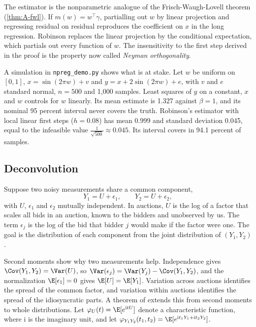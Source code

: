 The estimator is the nonparametric analogue of the Frisch-Waugh-Lovell theorem (\cref{thm:A-fwl}). If
$m(w)=w^\top\gamma$, partialling out $w$ by linear projection and regressing residual on residual
reproduces the coefficient on $x$ in the long regression. Robinson replaces the linear projection by
the conditional expectation, which partials out every function of $w$. The insensitivity to the first
step derived in the proof is the property now called \emph{Neyman orthogonality}.

A simulation in \texttt{npreg\_demo.py} shows what is at stake. Let $w$ be uniform on $[0,1]$,
$x=\sin(2\pi w)+v$ and $y=x+2\sin(2\pi w)+e$, with $v$ and $e$ standard normal, $n=500$ and 1,000 samples.
Least squares of $y$ on a constant, $x$ and $w$ controls for $w$ linearly. Its mean estimate is 1.327
against $\beta=1$, and its nominal 95 percent interval never covers the truth. Robinson's estimator with
local linear first steps ($h=0.08$) has mean 0.999 and standard deviation 0.045, equal to the infeasible
value $\frac{1}{\sqrt{500}}\approx0.045$. Its interval covers in 94.1 percent of samples.

\subsection{Deconvolution}\label{sec:A-deconv}

Suppose two noisy measurements share a common component,
\begin{equation}\label{eq:A-meas}
Y_1=U+\epsilon_1,\qquad Y_2=U+\epsilon_2,
\end{equation}
with $U$, $\epsilon_1$ and $\epsilon_2$ mutually independent. In auctions, $U$ is the log of a factor that
scales all bids in an auction, known to the bidders and unobserved by us. The term $\epsilon_j$ is the log of the
bid that bidder $j$ would make if the factor were one. The goal is the distribution of each
component from the joint distribution of $(Y_1,Y_2)$.

Second moments show why two measurements help. Independence gives $\Cov(Y_1,Y_2)=\Var(U)$, so
$\Var(\epsilon_j)=\Var(Y_j)-\Cov(Y_1,Y_2)$, and the normalization $\E[\epsilon_1]=0$ gives
$\E[U]=\E[Y_1]$. Variation across auctions identifies the spread of the common factor, and variation
within auctions identifies the spread of the idiosyncratic parts. A theorem of \citet{Kotlarski1966}
extends this from second moments to whole distributions. Let
$\varphi_U(t)=\E[e^{\mathrm{i}tU}]$ denote a characteristic function, where $\mathrm{i}$ is the
imaginary unit, and let $\varphi_{Y_1Y_2}(t_1,t_2)=\E[e^{\mathrm{i}t_1Y_1+\mathrm{i}t_2Y_2}]$.

